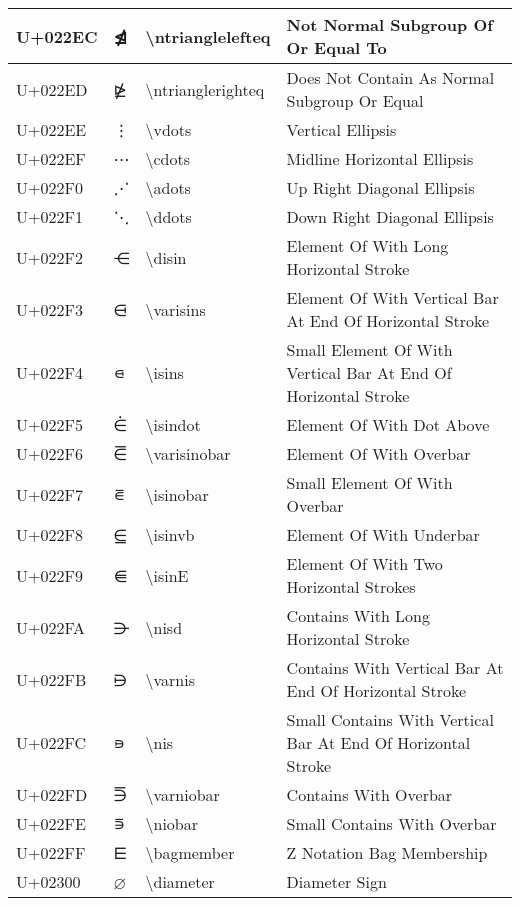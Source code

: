 \begin{table}[h]
\begin{tabulary}{\linewidth}{|L|L|L|L|}
\hline
U+022EC & ⋬ & {\textbackslash}ntrianglelefteq & Not Normal Subgroup Of Or Equal To \\
\hline
U+022ED & ⋭ & {\textbackslash}ntrianglerighteq & Does Not Contain As Normal Subgroup Or Equal \\
\hline
U+022EE & ⋮ & {\textbackslash}vdots & Vertical Ellipsis \\
\hline
U+022EF & ⋯ & {\textbackslash}cdots & Midline Horizontal Ellipsis \\
\hline
U+022F0 & ⋰ & {\textbackslash}adots & Up Right Diagonal Ellipsis \\
\hline
U+022F1 & ⋱ & {\textbackslash}ddots & Down Right Diagonal Ellipsis \\
\hline
U+022F2 & ⋲ & {\textbackslash}disin & Element Of With Long Horizontal Stroke \\
\hline
U+022F3 & ⋳ & {\textbackslash}varisins & Element Of With Vertical Bar At End Of Horizontal Stroke \\
\hline
U+022F4 & ⋴ & {\textbackslash}isins & Small Element Of With Vertical Bar At End Of Horizontal Stroke \\
\hline
U+022F5 & ⋵ & {\textbackslash}isindot & Element Of With Dot Above \\
\hline
U+022F6 & ⋶ & {\textbackslash}varisinobar & Element Of With Overbar \\
\hline
U+022F7 & ⋷ & {\textbackslash}isinobar & Small Element Of With Overbar \\
\hline
U+022F8 & ⋸ & {\textbackslash}isinvb & Element Of With Underbar \\
\hline
U+022F9 & ⋹ & {\textbackslash}isinE & Element Of With Two Horizontal Strokes \\
\hline
U+022FA & ⋺ & {\textbackslash}nisd & Contains With Long Horizontal Stroke \\
\hline
U+022FB & ⋻ & {\textbackslash}varnis & Contains With Vertical Bar At End Of Horizontal Stroke \\
\hline
U+022FC & ⋼ & {\textbackslash}nis & Small Contains With Vertical Bar At End Of Horizontal Stroke \\
\hline
U+022FD & ⋽ & {\textbackslash}varniobar & Contains With Overbar \\
\hline
U+022FE & ⋾ & {\textbackslash}niobar & Small Contains With Overbar \\
\hline
U+022FF & ⋿ & {\textbackslash}bagmember & Z Notation Bag Membership \\
\hline
U+02300 & ⌀ & {\textbackslash}diameter & Diameter Sign \\

\end{tabulary}
\end{table}
